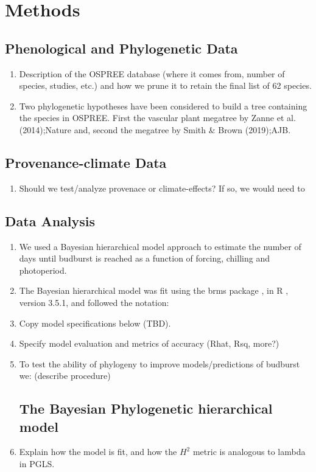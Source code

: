 \documentclass{article}\usepackage[]{graphicx}\usepackage[]{color}
\begin{document}
\section*{Methods}
\subsection*{Phenological and Phylogenetic Data}
\begin{enumerate}
\item Description of the OSPREE database (where it comes from, number of species, studies, etc.) and how we prune it to retain the final list of 62 species. 
\item Two phylogenetic hypotheses have been considered to build a tree containing the species in OSPREE. First the vascular plant megatree by Zanne et al. (2014);Nature and, second the megatree by Smith \& Brown (2019);AJB.
\end{enumerate}

\subsection*{Provenance-climate Data}
\begin{enumerate}
\item Should we test/analyze provenace or climate-effects? If so, we would need to 
\end{enumerate}

\subsection*{Data Analysis}
\begin{enumerate}
\item We used a Bayesian hierarchical model approach to estimate the number of days until budburst is reached as a function of forcing, chilling and photoperiod. 

\item The Bayesian hierarchical model was fit using the brms package \citep{brms}, in R \citep{R}, version 3.5.1, and followed the notation: 

\item Copy model specifications below (TBD).

\item Specify model evaluation and metrics of accuracy (Rhat, Rsq, more?)

\item To test the ability of phylogeny to improve models/predictions of budburst we: (describe procedure)


\subsection*{The Bayesian Phylogenetic hierarchical model}

\item Explain how the model is fit, and how the $H^{2}$ metric is analogous to lambda in PGLS.


\end{enumerate}
\end{document}

